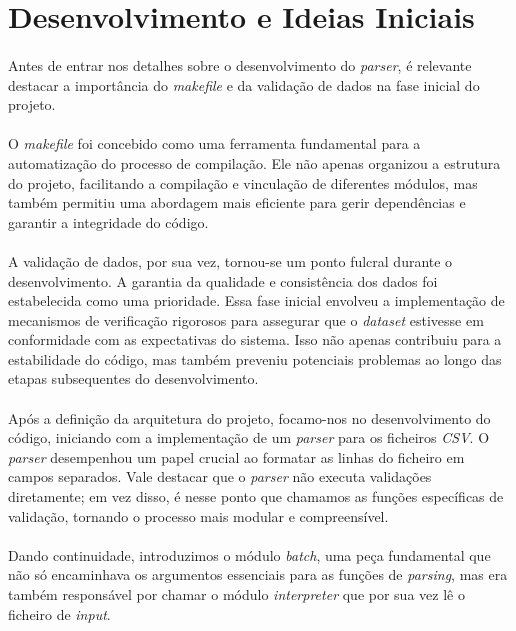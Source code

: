 \documentclass{article}
\begin{document}
\section{Desenvolvimento e Ideias Iniciais}
\paragraph{}Antes de entrar nos detalhes sobre o desenvolvimento do \textit{parser}, é relevante destacar a importância do \textit{makefile} e da validação de dados na fase inicial do projeto.

\paragraph{}O \textit{makefile} foi concebido como uma ferramenta fundamental para a automatização do processo de compilação. Ele não apenas organizou a estrutura do projeto, facilitando a compilação e vinculação de diferentes módulos, mas também permitiu uma abordagem mais eficiente para gerir dependências e garantir a integridade do código.

\paragraph{}A validação de dados, por sua vez, tornou-se um ponto fulcral durante o desenvolvimento. A garantia da qualidade e consistência dos dados foi estabelecida como uma prioridade. Essa fase inicial envolveu a implementação de mecanismos de verificação rigorosos para assegurar que o \textit{dataset} estivesse em conformidade com as expectativas do sistema. Isso não apenas contribuiu para a estabilidade do código, mas também preveniu potenciais problemas ao longo das etapas subsequentes do desenvolvimento. 

\paragraph{}Após a definição da arquitetura do projeto, focamo-nos no desenvolvimento do código, iniciando com a implementação de um \textit{parser} para os ficheiros \textit{CSV}. O \textit{parser} desempenhou um papel crucial ao formatar as linhas do ficheiro em campos separados. Vale destacar que o \textit{parser} não executa validações diretamente; em vez disso, é nesse ponto que chamamos as funções específicas de validação, tornando o processo mais modular e compreensível.

\paragraph{}Dando continuidade, introduzimos o módulo \textit{batch}, uma peça fundamental que não só encaminhava os argumentos essenciais para as funções de \textit{parsing}, mas era também responsável por chamar o módulo \textit{interpreter} que por sua vez lê o ficheiro de \textit{input}.
\end{document}
